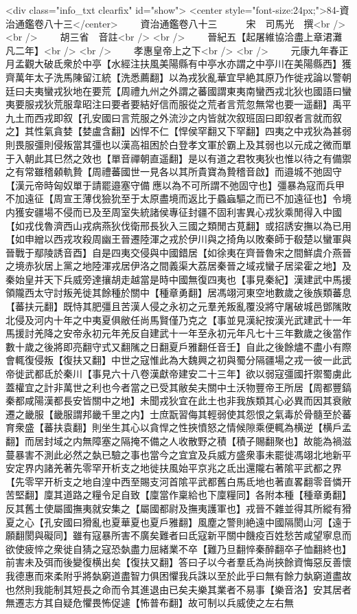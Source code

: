 <div class="info_txt clearfix" id="show">
<center style="font-size:24px;">84-資治通鑑卷八十三</center>
  　　資治通鑑卷八十三　　　宋　司馬光　撰<br />
<br />
　　胡三省　音註<br />
<br />
　　晉紀五【起屠維協洽盡上章涒灘凡二年】<br />
<br />
　　孝惠皇帝上之下<br />
<br />
　　元康九年春正月孟觀大破氐衆於中亭【水經注扶風美陽縣有中亭水亦謂之中亭川在美陽縣西】獲齊萬年太子洗馬陳留江統【洗悉薦翻】以為戎狄亂華宜早絶其原乃作徙戎論以警朝廷曰夫夷蠻戎狄地在要荒【周禮九州之外謂之蕃國謂東夷南蠻西戎北狄也國語曰蠻夷要服戎狄荒服韋昭注曰要者要結好信而服從之荒者言荒忽無常也要一遥翻】禹平九土而西戎即叙【孔安國曰言荒服之外流沙之内皆就次叙班固曰即叙者言就而叙之】其性氣貪婪【婪盧含翻】凶悍不仁【悍侯罕翻又下罕翻】四夷之中戎狄為甚弱則畏服彊則侵叛當其彊也以漢高祖困於白登孝文軍於霸上及其弱也以元成之微而單于入朝此其巳然之效也【單音禪朝直遥翻】是以有道之君牧夷狄也惟以待之有備禦之有常雖稽顙軌贄【周禮蕃國世一見各以其所貴寶為贄稽音啟】而邉城不弛固守【漢元帝時匈奴單于請罷邉塞守備應以為不可所謂不弛固守也】彊暴為寇而兵甲不加遠征【周宣王薄伐獫狁至于太原盡境而返比于蟁蝱驅之而已不加遠征也】令境内獲安疆場不侵而已及至周室失統諸侯專征封疆不固利害異心戎狄乘閒得入中國【如戎伐魯濟西山戎病燕狄伐衛邢長狄入三國之類閒古莧翻】或招誘安撫以為已用【如申繒以西戎攻殺周幽王晉遷陸渾之戎於伊川與之掎角以敗秦師于殽楚以蠻軍與晉戰于鄢陵誘音酉】自是四夷交侵與中國錯居【如徐夷在齊晉魯宋之間鮮虞介燕晉之境赤狄居上黨之地陸渾戎居伊洛之間義渠大荔居秦晉之域戎蠻子居梁霍之地】及秦始皇并天下兵威旁達攘胡走越當是時中國無復四夷也【事見秦紀】漢建武中馬援領隴西太守討叛羌徙其餘種於關中【種章勇翻】居馮翊河東空地數歲之後族類蕃息【蕃扶元翻】既恃其肥彊且苦漢人侵之永初之元羣羌叛亂覆没將守屠破城邑鄧隲敗北侵及河内十年之中夷夏俱敝任尚馬賢僅乃克之【事並見漢紀按漢光武建武十一年馬援討羌降之安帝永初元年羌反自建武十一年至永初元年凡七十三年數歲之後當作數十歲之後將即亮翻守式又翻隲之日翻夏戶雅翻任音壬】自此之後餘燼不盡小有際會輒復侵叛【復扶又翻】中世之寇惟此為大魏興之初與蜀分隔疆場之戎一彼一此武帝徙武都氐於秦川【事見六十八卷漢獻帝建安二十三年】欲以弱寇彊國扞禦蜀虜此蓋權宜之計非萬世之利也今者當之已受其敝矣夫關中土沃物豐帝王所居【周都豐鎬秦都咸陽漢都長安皆關中之地】未聞戎狄宜在此土也非我族類其心必異而因其衰敝遷之畿服【畿服謂邦畿千里之内】士庶翫習侮其輕弱使其怨恨之氣毒於骨髓至於蕃育衆盛【蕃扶袁翻】則坐生其心以貪悍之性挾憤怒之情候隙乘便輒為横逆【横戶孟翻】而居封域之内無障塞之隔掩不備之人收散野之積【積子賜翻聚也】故能為禍滋蔓暴害不測此必然之埶已驗之事也當今之宜宜及兵威方盛衆事未罷徙馮翊北地新平安定界内諸羌著先零罕开析支之地徙扶風始平京兆之氐出還隴右著隂平武都之界【先零罕开析支之地自湟中西至賜支河首隂平武都舊白馬氐地也著直畧翻零音憐开苦堅翻】廩其道路之糧令足自致【廩當作稟給也下廩糧同】各附本種【種章勇翻】反其舊土使屬國撫夷就安集之【屬國都尉及撫夷護軍也】戎晉不雜並得其所縱有猾夏之心【孔安國曰猾亂也夏華夏也夏戶雅翻】風塵之警則絶遠中國隔閡山河【遠于願翻閡與礙同】雖有寇暴所害不廣矣難者曰氐寇新平關中饑疫百姓愁苦咸望寧息而欲使疲悴之衆徙自猜之寇恐埶盡力屈緒業不卒【難乃旦翻悴秦醉翻卒子恤翻終也】前害未及弭而後變復横出矣【復扶又翻】答曰子以今者羣氐為尚挾餘資悔惡反善懷我德惠而來柔附乎將埶窮道盡智力俱困懼我兵誅以至於此乎曰無有餘力埶窮道盡故也然則我能制其短長之命而令其進退由已矣夫樂其業者不易事【樂音洛】安其居者無遷志方其自疑危懼畏怖促遽【怖普布翻】故可制以兵威使之左右無
